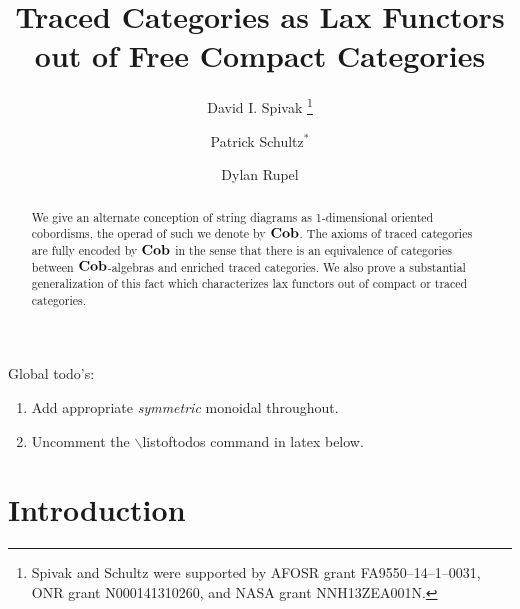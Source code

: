 \documentclass[12pt,oneside,article,draft]{memoir}
\title{Traced Categories as Lax Functors out of Free Compact Categories}
\author{
   David I. Spivak
      \thanks{Spivak and Schultz were supported by AFOSR grant FA9550--14--1--0031, ONR grant N000141310260, and NASA grant NNH13ZEA001N.}
   \and Patrick Schultz${}^*$%
   \and Dylan Rupel
}
\begin{document}
\tightlists
\firmlists

\maketitle
\begin{abstract}
   We give an alternate conception of string diagrams as 1-dimensional oriented cobordisms, the
   operad of such we denote by $\mathbf{Cob}$.  The axioms of traced categories are fully encoded by $\mathbf{Cob}$
   in the sense that there is an equivalence of categories between $\mathbf{Cob}$-algebras and enriched
   traced categories.  We also prove a substantial generalization of this fact which characterizes
   lax functors out of compact or traced categories.
\end{abstract}
Global todo's:
\begin{enumerate}
   \item Add appropriate {\em symmetric\/} monoidal throughout.
   \item Uncomment the $\backslash${listoftodos} command in latex below.
\end{enumerate}

\setcounter{tocdepth}{1}
\tableofcontents*

\chapter{Introduction}
\end{document}
